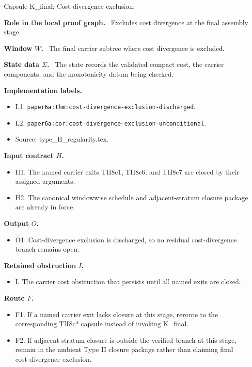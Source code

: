 \documentclass[11pt]{amsart}
\newcommand{\capsulefield}[1]{\par\smallskip\noindent\textbf{#1.}\ }
\begin{document}
\begin{proofcapsule}{Capsule K\_final: Cost-divergence exclusion.}
  \capsulefield{Role in the local proof graph}
  Excludes cost divergence at the final assembly stage.

  \capsulefield{Window \(W\)}
The final carrier subtree where cost divergence is excluded.

  \capsulefield{State data \(\Sigma\)}
The state records the validated compact cost, the carrier components, and the monotonicity datum being checked.

  \capsulefield{Implementation labels}
  \begin{itemize}[leftmargin=1.8em]
  \item L1. \texttt{paper6a:thm:cost-divergence-exclusion-discharged}.
  \item L2. \texttt{paper6a:cor:cost-divergence-exclusion-unconditional}.
  \item Source: type\_II\_regularity.tex.
  \end{itemize}

  \capsulefield{Input contract \(H\)}
  \begin{itemize}[leftmargin=1.8em]
  \item H1. The named carrier exits TII8c1, TII8c6, and TII8c7 are closed by their assigned arguments.
  \item H2. The canonical windowwise schedule and adjacent-stratum closure package are already in force.
  \end{itemize}

  \capsulefield{Output \(O\)}
  \begin{itemize}[leftmargin=1.8em]
  \item O1. Cost-divergence exclusion is discharged, so no residual cost-divergence branch remains open.
  \end{itemize}

  \capsulefield{Retained obstruction \(I\)}
  \begin{itemize}[leftmargin=1.8em]
  \item I. The carrier cost obstruction that persists until all named exits are closed.
  \end{itemize}

  \capsulefield{Route \(F\)}
  \begin{itemize}[leftmargin=1.8em]
  \item F1. If a named carrier exit lacks closure at this stage, reroute to the corresponding TII8c* capsule instead of invoking K\_final.
  \item F2. If adjacent-stratum closure is outside the verified branch at this stage, remain in the ambient Type II closure package rather than claiming final cost-divergence exclusion.
  \end{itemize}


\end{proofcapsule}
\end{document}
